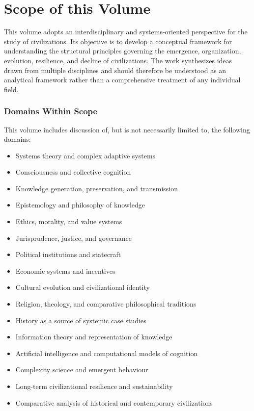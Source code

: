 \chapter*{Scope of this Volume}

This volume adopts an interdisciplinary and systems-oriented perspective for the study of civilizations. Its objective is to develop a conceptual framework for understanding the structural principles governing the emergence, organization, evolution, resilience, and decline of civilizations. The work synthesizes ideas drawn from multiple disciplines and should therefore be understood as an analytical framework rather than a comprehensive treatment of any individual field.

\subsection*{Domains Within Scope}

This volume includes discussion of, but is not necessarily limited to, the following domains:

\begin{itemize}
	\item Systems theory and complex adaptive systems
	\item Consciousness and collective cognition
	\item Knowledge generation, preservation, and transmission
	\item Epistemology and philosophy of knowledge
	\item Ethics, morality, and value systems
	\item Jurisprudence, justice, and governance
	\item Political institutions and statecraft
	\item Economic systems and incentives
	\item Cultural evolution and civilizational identity
	\item Religion, theology, and comparative philosophical traditions
	\item History as a source of systemic case studies
	\item Information theory and representation of knowledge
	\item Artificial intelligence and computational models of cognition
	\item Complexity science and emergent behaviour
	\item Long-term civilizational resilience and sustainability
	\item Comparative analysis of historical and contemporary civilizations
\end{itemize}

